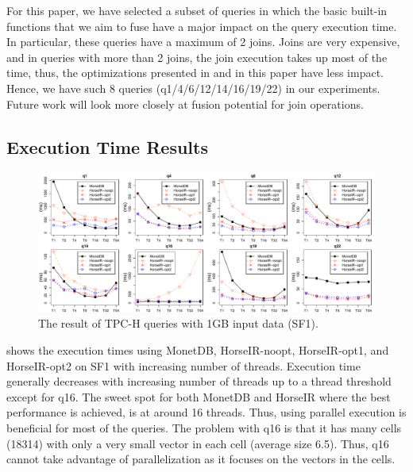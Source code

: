 For this paper, we have selected a subset of queries in which the basic built-in
functions that we aim to fuse have a major impact on the query execution time.
In particular, these queries have a maximum of 2 joins. Joins are very
expensive, and in queries with more than 2 joins, the join execution takes up
most of the time, thus, the optimizations presented in \OldPaper and in this
paper have less impact.
Hence, we have such 8 queries (q1/4/6/12/14/16/19/22) in our experiments.
Future work will look more closely at fusion potential for join operations.  



\subsection{Execution Time Results}

\begin{figure}[htbp]
\centering
\includegraphics[width=\textwidth]{./src/figure/sf1-v2.pdf}
\caption{The result of TPC-H queries with 1GB input data (SF1).}
\label{fig:tpch_result}
\end{figure}


 shows the execution times using MonetDB, HorseIR-noopt,
HorseIR-opt1, and HorseIR-opt2 on SF1 with increasing number of threads. 
Execution time generally decreases with increasing number of threads up to a
thread threshold except for q16. The sweet spot for both MonetDB and HorseIR
where the best performance is achieved, is at around 16 threads. Thus, using
parallel execution is beneficial for most of the queries. The problem with q16
is that it has many cells (18314) with only a very small vector in each cell
(average size 6.5). Thus, q16 cannot take advantage of parallelization as it
focuses on the vectors in the cells. 

